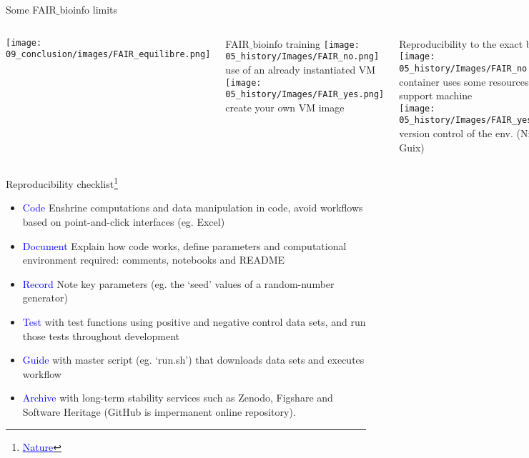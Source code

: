 \begin{frame}{Some FAIR$\_$bioinfo limits}
\begin{columns}
\begin{center}
    \texttt{[image: 09\_conclusion/images/FAIR\_equilibre.png]}
\end{center}
\begin{block}{FAIR$\_$bioinfo training}
\texttt{[image: 05\_history/Images/FAIR\_no.png]} use of an already instantiated VM\\
\texttt{[image: 05\_history/Images/FAIR\_yes.png]} create your own VM image
\end{block}
\begin{block}{Reproducibility to the exact bit?}
\texttt{[image: 05\_history/Images/FAIR\_no.png]} container uses some resources of the support machine\\
\texttt{[image: 05\_history/Images/FAIR\_yes.png]} version control of the env. (Nix, Guix)
\end{block}
\begin{block}{Parallelization:}
\texttt{[image: 05\_history/Images/FAIR\_no.png]} loss of computational order, multi-threading, same hardware?\\
\texttt{[image: 05\_history/Images/FAIR\_yes.png]}
...?
\end{block}
\end{columns}
\end{frame}

\begin{frame}{Reproducibility checklist\footnote{\href{https://www.nature.com/articles/d41586-020-02462-7}{\textcolor{blue}{\underline{Nature}}}}}

\begin{itemize}
    \item \textcolor{blue}{Code} Enshrine computations and data manipulation in code, avoid workflows based on point-and-click interfaces (eg. Excel)
    \item \textcolor{blue}{Document} Explain how code works, define parameters and computational environment required: comments, notebooks and README
    \item \textcolor{blue}{Record} Note key parameters (eg. the ‘seed’ values of a random-number generator)
    \item \textcolor{blue}{Test} with test functions using positive and negative control data sets, and run those tests throughout development
    \item \textcolor{blue}{Guide} with master script (eg. ‘run.sh’) that downloads data sets and executes workflow
    \item \textcolor{blue}{Archive} with long-term stability services such as Zenodo, Figshare and Software Heritage (GitHub is impermanent online repository).
\end{itemize}
\end{frame}

